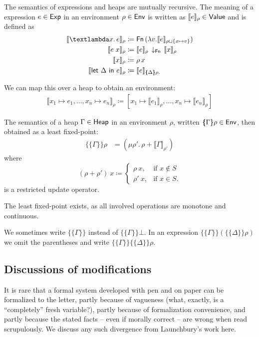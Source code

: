 \documentclass{jfp1}
\theoremstyle{nonumberbreak}
\newcommand{\sExp}   {\text{\textsf{Exp}}}
\newcommand{\sHeap}  {\text{\textsf{Heap}}}
\newcommand{\sValue} {\text{\textsf{Value}}}
\newcommand{\sEnv}   {\text{\textsf{Env}}}
\newcommand{\sFn}[1]{\text{\textsf{Fn}}\,(#1)}
\newcommand{\sFnProj}[2]{#1\,\downarrow_{\text{\textsf{Fn}}}\,#2}
\newcommand{\keyword}[1]{\text{\textsf{#1}}}
\newcommand{\sApp}[2]{#1\;#2}
\newcommand{\sLam}[2]{\text{\textlambda} #1.\, #2}
\newcommand{\sLet}[2]{\keyword{let}~#1~\keyword{in}~#2}
\newcommand{\dom}[1]{\text{dom}\;#1}
\newcommand{\xen}{x_1\mapsto e_1, \ldots, x_n\mapsto e_n}
\newcommand{\dsem}[2]{\llbracket #1 \rrbracket_{#2}}
\newcommand{\esem}[1]{\{\!\!\!\{#1\}\!\!\!\}}
\newcommand{\upd}[1]{\mathop{++_{#1}}}
\begin{document}
The semantics of expressions and heaps are mutually recursive. The meaning of a expression $e \in \sExp$ in an environment $\rho \in \sEnv$ is written as $\dsem e \rho \in \sValue$ and is defined as
\begin{align*}
\dsem{\sLam x e}\rho &\coloneqq \sFn{\lambda v. \dsem e {\rho \sqcup \{x \mapsto v\}}}\\
\dsem{\sApp e  x}\rho &\coloneqq \sFnProj {\dsem e \rho}{\dsem x \rho}\\
\dsem{x}\rho &\coloneqq \rho\,x\\
\dsem{\sLet{\Delta}e}\rho &\coloneqq \dsem e {\esem{\Delta}\rho.}
\end{align*}

We can map this over a heap to obtain an environment:
\begin{align*}
\dsem{\xen}\rho \coloneqq [x_1 \mapsto \dsem{e_1}{\rho}, \ldots, x_n \mapsto \dsem{e_n}{\rho}]
\end{align*}

The semantics of a heap $\Gamma \in \sHeap$ in an environment $\rho$, written $\esem \Gamma \rho \in \sEnv$, then obtained as a least  fixed-point:
\begin{align*}
\esem{\Gamma}\rho &= (\mu \rho'.\, \rho \upd{\dom \Gamma} \dsem{\Gamma}{\rho'})
\end{align*}
where
\[
(\rho \upd{S} \rho')~x \coloneqq
\begin{cases}
\rho~x, &\text{if } x \notin S \\
\rho'~x, &\text{if } x \in S.
\end{cases}
\]
is a restricted update operator.

The least fixed-point exists, as all involved operations are monotone and continuous.

We sometimes write $\esem{\Gamma}$ instead of $\esem{\Gamma}{\bot}$. In an expression $\esem{\Gamma}(\esem{\Delta}\rho)$ we omit the parentheses and write $\esem{\Gamma}\esem{\Delta}\rho$.


\subsection{Discussions of modifications}
\label{sec_modifications1}

It is rare that a formal system developed with pen and on paper can be formalized to the letter, partly because of vagueness (what, exactly, is a ``completely'' fresh variable?), partly because of formalization convenience, and partly because the stated facts -- even if morally correct -- are wrong when read scrupulously. We discuss any such divergence from Launchbury's work here.
\end{document}

